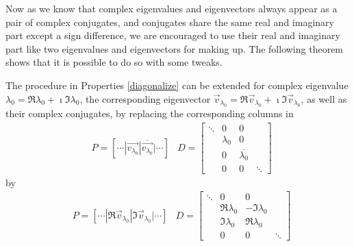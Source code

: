 Now as we know that complex eigenvalues and eigenvectors always appear as a pair of complex conjugates, and conjugates share the same real and imaginary part except a sign difference, we are encouraged to use their real and imaginary part like two eigenvalues and eigenvectors for making up. The following theorem shows that it is possible to do so with some tweaks.

\begin{thm}
\label{diagonalize2}
The procedure in Properties \ref{diagonalize} can be extended for complex eigenvalue $\lambda_0 = \Re{\lambda_0} + \imath \Im{\lambda_0}$, the corresponding eigenvector $\vec{v}_{\lambda_0} = \Re{\vec{v}_{\lambda_0}} + \imath \Im{\vec{v}_{\lambda_0}}$, as well as their complex conjugates, by replacing the corresponding columns in
\begin{align*}
&P = [\cdots|\vec{v_{\lambda_0}}|\overline{\vec{v_{\lambda_0}}}|\cdots]
&D =
\begin{bmatrix}
\ddots & 0 & 0 & \\
& \lambda_0 & 0 & \\
& 0 & \overline{\lambda_0} & \\
& 0 & 0 & \ddots
\end{bmatrix}
\end{align*}
by
\begin{align*}
&P = [\cdots|\Re{\vec{v}_{\lambda_0}}|\Im{\vec{v}_{\lambda_0}}|\cdots]
&D =
\begin{bmatrix}
\ddots & 0 & 0 & \\
& \Re{\lambda_0} & -\Im{\lambda_0} & \\
& \Im{\lambda_0} & \Re{\lambda_0} & \\
& 0 & 0 & \ddots
\end{bmatrix}
\end{align*}

\end{thm}
